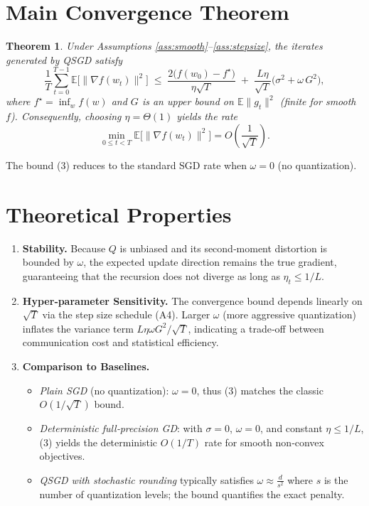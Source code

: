 \documentclass[11pt]{article}
\newtheorem{theorem}{Theorem}
\newcommand{\E}{\mathbb{E}}
\begin{document}
\section*{Main Convergence Theorem}
\begin{theorem}\label{thm:nonconvex}
Under Assumptions \ref{ass:smooth}–\ref{ass:stepsize}, the iterates generated by QSGD satisfy
\[
\frac{1}{T}\sum_{t=0}^{T-1}\E\bigl[\|\nabla f(w_t)\|^{2}\bigr]\;
\le\;
\frac{2\bigl(f(w_0)-f^{\star}\bigr)}{\eta\sqrt{T}}
\;+\;
\frac{L\eta}{\sqrt{T}}\bigl(\sigma^{2}+\omega\,G^{2}\bigr),
\tag{3}
\]
where $f^{\star}=\inf_{w}f(w)$ and $G$ is an upper bound on $\E\|g_t\|^{2}$ (finite for smooth $f$).  
Consequently, choosing $\eta =\Theta(1)$ yields the rate
\[
\min_{0\le t<T}\E\bigl[\|\nabla f(w_t)\|^{2}\bigr]=O\!\left(\frac{1}{\sqrt{T}}\right).
\]
\end{theorem}
The bound (3) reduces to the standard SGD rate when $\omega=0$ (no quantization).

\section*{Theoretical Properties}
\begin{enumerate}[label=\arabic*.]
\item \textbf{Stability.} Because $Q$ is unbiased and its second‑moment distortion is bounded by $\omega$, the expected update direction remains the true gradient, guaranteeing that the recursion does not diverge as long as $\eta_t\le 1/L$.
\item \textbf{Hyper‑parameter Sensitivity.} The convergence bound depends linearly on $\sqrt{T}$ via the step size schedule (A4). Larger $\omega$ (more aggressive quantization) inflates the variance term $L\eta\omega G^{2}/\sqrt{T}$, indicating a trade‑off between communication cost and statistical efficiency.
\item \textbf{Comparison to Baselines.}
\begin{itemize}
\item \emph{Plain SGD} (no quantization): $\omega=0$, thus (3) matches the classic $O(1/\sqrt{T})$ bound.
\item \emph{Deterministic full‑precision GD}: with $\sigma=0$, $\omega=0$, and constant $\eta\le 1/L$, (3) yields the deterministic $O(1/T)$ rate for smooth non‑convex objectives.
\item \emph{QSGD with stochastic rounding} typically satisfies $\omega\approx \frac{d}{s^{2}}$ where $s$ is the number of quantization levels; the bound quantifies the exact penalty.
\end{itemize}
\end{enumerate}
\newpage
\end{document}
